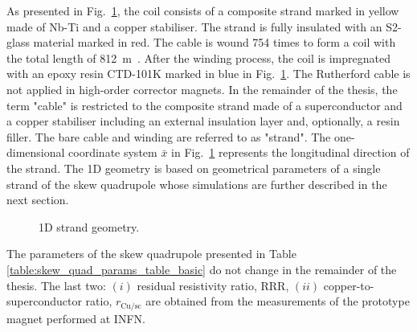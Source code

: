 As presented in Fig.~\ref{fig: 1d_strand_geometry}, the coil consists of a composite strand marked in yellow made of Nb-Ti and a copper stabiliser. The strand is fully insulated with an S2-glass material marked in red. The cable is wound 754 times to form a coil with the total length of 812~m~\cite{samuele_mariotto_mails}. After the winding process, the coil is impregnated with an epoxy resin CTD-101K marked in blue in Fig.~\ref{fig: 1d_strand_geometry}. The Rutherford cable is not applied in high-order corrector magnets. In the remainder of the thesis, the term "cable" is restricted to the composite strand made of a superconductor and a copper stabiliser including an external insulation layer and, optionally, a resin filler. The bare cable and winding are referred to as "strand". The one-dimensional coordinate system $\bar x$ in Fig.~\ref{fig: 1d_strand_geometry} represents the longitudinal direction of the strand. The 1D geometry is based on geometrical parameters of a single strand of the skew quadrupole whose simulations are further described in the next section. 

\begin{figure}[H]
    \centering
    \caption{1D strand geometry.}
    \label{fig: 1d_strand_geometry}
\end{figure}

The parameters of the skew quadrupole presented in Table \ref{table:skew_quad_params_table_basic} do not change in the remainder of the thesis. The last two: $(i)$ residual resistivity ratio, RRR, $(ii)$ copper-to-superconductor ratio, $r_\text{Cu/sc}$ are obtained from the measurements of the prototype magnet performed at INFN.~\cite{marco_prioli_mails}

